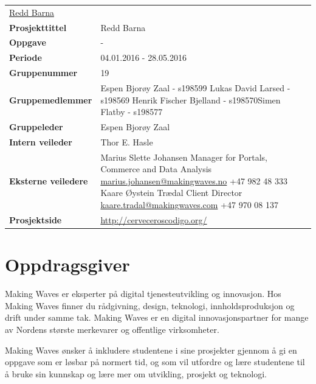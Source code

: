 \begin{flushleft}
\begin{tabular}[ht]{@{}lp{100mm}@{}}
\href{http://www.reddbarna.no/}{Redd Barna} \\
\textbf{Prosjekttittel} & Redd Barna \\ 
\textbf{Oppgave} & - \\ 
\textbf{Periode} & 04.01.2016 - 28.05.2016 \\ 
\textbf{Gruppenummer} & 19 \\ 
\textbf{Gruppemedlemmer} & Espen Bjorøy Zaal - s198599 \newline Lukas David Larsed - s198569 \newline Henrik Fischer Bjelland - s198570\newline Simen Flatby - s198577 \\ 
\textbf{Gruppeleder} & Espen Bjorøy Zaal \\ 
\textbf{Intern veileder} & Thor E. Hasle \\ 
\textbf{Eksterne veiledere} & Marius Slette Johansen \newline Manager for Portals, Commerce and Data Analysis \newline \href{mailto:marius.johansen@makingwaves.no}{marius.johansen@makingwaves.no} \newline +47 982 48 333 \newline \newline Kaare Øystein Trædal \newline Client Director \newline \href{mailto:kaare.tradal@makingwaves.com}{kaare.tradal@makingwaves.com} \newline +47 970 08 137 \\
\textbf{Prosjektside} & \url{http://cerveceroscodigo.org/} \\
\end{tabular} 
\end{flushleft}

\section{Oppdragsgiver}
Making Waves er eksperter på digital tjenesteutvikling og innovasjon. Hos Making Waves finner du rådgivning, design, teknologi, innholdsproduksjon og drift under samme tak. Making Waves er en digital innovasjonspartner for mange av Nordens største merkevarer og offentlige virksomheter.

Making Waves ønsker å inkludere studentene i sine prosjekter gjennom å gi en oppgave som er løsbar på normert tid, og som vil utfordre og lære studentene til å bruke sin kunnskap og lære mer om utvikling, prosjekt og teknologi.

